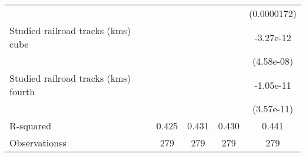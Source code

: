 {\begin{tabular}{l*{4}{c}}
                    &                     &                     &                     & (0.0000172)         \\
[1em]
Studied railroad tracks (kms) cube&                     &                     &                     &   -3.27e-12         \\
                    &                     &                     &                     &  (4.58e-08)         \\
[1em]
Studied railroad tracks (kms) fourth&                     &                     &                     &   -1.05e-11         \\
                    &                     &                     &                     &  (3.57e-11)         \\
\hline
R-squared           &       0.425         &       0.431         &       0.430         &       0.441         \\
Observationss       &         279         &         279         &         279         &         279         \\
\hline\hline
\end{tabular}
}
